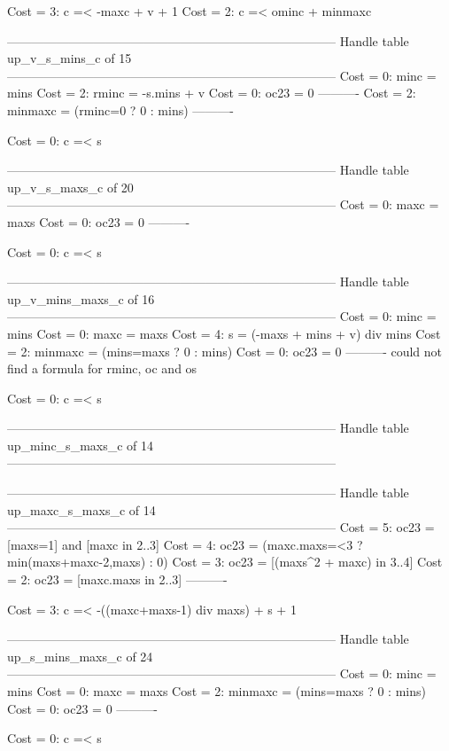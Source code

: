 Cost =  3:  c =< -maxc + v + 1
Cost =  2:  c =< ominc + minmaxc

--------------------------------------------------------------------------------
Handle table up_v_s_mins_c of 15
--------------------------------------------------------------------------------
Cost =  0:  minc    = mins
Cost =  2:  rminc   = -s.mins + v
Cost =  0:  oc23    = 0
----------
Cost =  2:  minmaxc = (rminc=0 ? 0 : mins)
----------

Cost =  0:  c =< s

--------------------------------------------------------------------------------
Handle table up_v_s_maxs_c of 20
--------------------------------------------------------------------------------
Cost =  0:  maxc = maxs
Cost =  0:  oc23 = 0
----------

Cost =  0:  c =< s

--------------------------------------------------------------------------------
Handle table up_v_mins_maxs_c of 16
--------------------------------------------------------------------------------
Cost =  0:  minc    = mins
Cost =  0:  maxc    = maxs
Cost =  4:  s       = (-maxs + mins + v) div mins
Cost =  2:  minmaxc = (mins=maxs ? 0 : mins)
Cost =  0:  oc23    = 0
----------
could not find a formula for rminc, oc and os

Cost =  0:  c =< s

--------------------------------------------------------------------------------
Handle table up_minc_s_maxs_c of 14
--------------------------------------------------------------------------------


--------------------------------------------------------------------------------
Handle table up_maxc_s_maxs_c of 14
--------------------------------------------------------------------------------
Cost =  5:  oc23 = [maxs=1] and [maxc in 2..3]
Cost =  4:  oc23 = (maxc.maxs=<3 ? min(maxs+maxc-2,maxs) : 0)
Cost =  3:  oc23 = [(maxs^2 + maxc) in 3..4]
Cost =  2:  oc23 = [maxc.maxs in 2..3]
----------

Cost =  3:  c =< -((maxc+maxs-1) div maxs) + s + 1

--------------------------------------------------------------------------------
Handle table up_s_mins_maxs_c of 24
--------------------------------------------------------------------------------
Cost =  0:  minc    = mins
Cost =  0:  maxc    = maxs
Cost =  2:  minmaxc = (mins=maxs ? 0 : mins)
Cost =  0:  oc23    = 0
----------

Cost =  0:  c =< s
